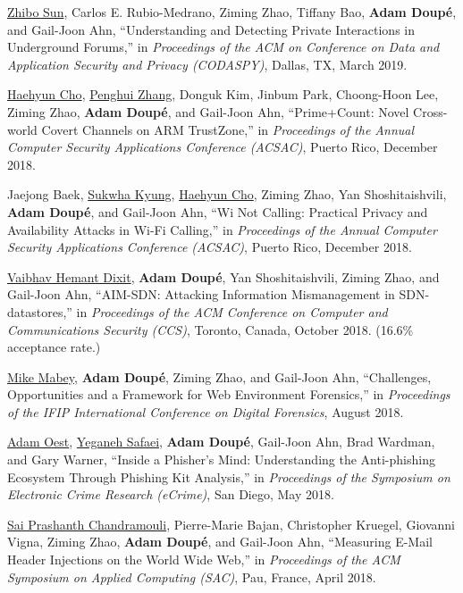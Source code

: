 \documentclass[11pt,letterpaper,sans]{moderncv}
\begin{document}
\begin{etaremune}
\item \underline{Zhibo Sun}, Carlos E.
Rubio-Medrano, Ziming Zhao, Tiffany Bao, \textbf{Adam Doup\'e}, and Gail-Joon Ahn, ``Understanding and Detecting Private Interactions in Underground Forums,'' in \emph{Proceedings of the ACM on Conference on Data and Application Security and Privacy (CODASPY)}, Dallas, TX, March 2019.

\item \underline{Haehyun Cho}, \underline{Penghui Zhang}, Donguk Kim, Jinbum Park, Choong-Hoon Lee, Ziming Zhao, \textbf{Adam Doup\'e}, and Gail-Joon Ahn, ``Prime+Count: Novel Cross-world Covert Channels on ARM TrustZone,'' in \emph{Proceedings of the Annual Computer Security Applications Conference (ACSAC)}, Puerto Rico, December 2018.

\item Jaejong Baek, \underline{Sukwha Kyung}, \underline{Haehyun Cho}, Ziming Zhao, Yan Shoshitaishvili, \textbf{Adam Doup\'e}, and Gail-Joon Ahn, ``Wi Not Calling: Practical Privacy and Availability Attacks in Wi-Fi Calling,'' in \emph{Proceedings of the Annual Computer Security Applications Conference (ACSAC)}, Puerto Rico, December 2018.

\item \underline{Vaibhav Hemant Dixit}, \textbf{Adam Doup\'e}, Yan
  Shoshitaishvili, Ziming Zhao, and Gail-Joon Ahn, ``AIM-SDN:
  Attacking Information Mismanagement in SDN-datastores,'' in
  \emph{Proceedings of the ACM Conference on Computer and
    Communications Security (CCS)}, Toronto, Canada, October 2018. (16.6\% acceptance rate.)

\item \underline{Mike Mabey}, \textbf{Adam Doup\'e}, Ziming Zhao, and Gail-Joon Ahn, ``Challenges, Opportunities and a Framework for Web Environment Forensics,'' in \emph{Proceedings of the IFIP International Conference on Digital Forensics}, August 2018.


\item \underline{Adam Oest}, \underline{Yeganeh Safaei}, \textbf{Adam Doup\'e},
  Gail-Joon Ahn, Brad Wardman, and Gary Warner, ``Inside a Phisher's
  Mind: Understanding the Anti-phishing Ecosystem Through Phishing Kit
  Analysis,'' in \emph{Proceedings of the Symposium on Electronic
    Crime Research (eCrime)}, San Diego, May 2018.

\item \underline{Sai Prashanth Chandramouli}, Pierre-Marie Bajan,
  Christopher Kruegel, Giovanni Vigna, Ziming Zhao, \textbf{Adam Doup\'e}, and
  Gail-Joon Ahn, ``Measuring E-Mail Header Injections on the World
  Wide Web,'' in \emph{Proceedings of the ACM Symposium on Applied
    Computing (SAC)}, Pau, France, April 2018.


\end{etaremune}
\end{document}
